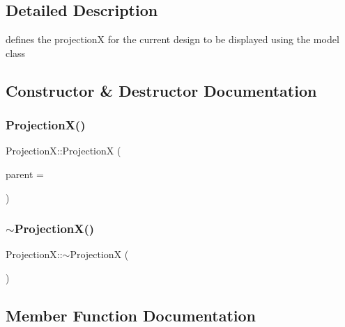 \subsection{Detailed Description}
defines the projectionX for the current design to be displayed using the model class 

\subsection{Constructor \& Destructor Documentation}
\mbox{\label{class_projection_x_a251536fb76aabbf276ce0cd2341d1dc3}} 
\subsubsection{\texorpdfstring{Projection\+X()}{ProjectionX()}}
{\footnotesize\ttfamily Projection\+X\+::\+ProjectionX (\begin{DoxyParamCaption}\item[{Q\+Widget $\ast$}]{parent = {} }\end{DoxyParamCaption})\hspace{0.3cm}{\ttfamily [explicit]}}

\mbox{\label{class_projection_x_a903b7fc4e98525180ec9a3bed152a70a}} 
\subsubsection{\texorpdfstring{$\sim$\+Projection\+X()}{~ProjectionX()}}
{\footnotesize\ttfamily Projection\+X\+::$\sim$\+ProjectionX (\begin{DoxyParamCaption}{ }\end{DoxyParamCaption})}



\subsection{Member Function Documentation}
\mbox{\label{class_projection_x_af94caa374ed76c3cf81c80429c67aee9}} 
